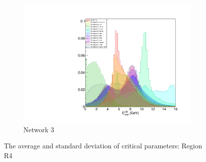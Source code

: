 \documentclass[12pt]{thesis}  %
\begin{document}
\begin{figure}
\begin{subfigure}[b]{0.475\textwidth}
            \includegraphics[width=\textwidth]{images/test.pdf}
            \caption[]%
            {{\small Network 3}}    
            \label{fig:mean and std of net34}
        \end{subfigure}
                \caption[ The average and standard deviation of critical parameters ]
        {\small The average and standard deviation of critical parameters: Region R4} 
        \end{figure}
\end{document}
